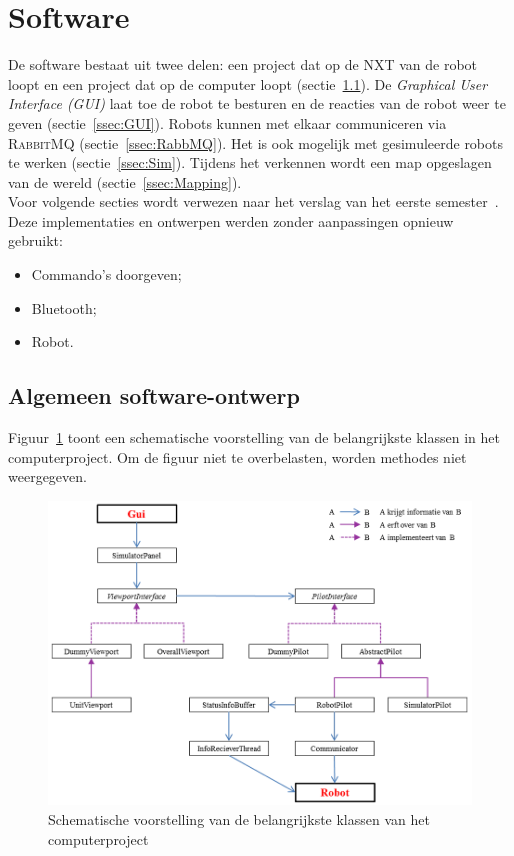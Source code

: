 \documentclass[eind]{penoverslag}
\begin{document}
\section{Software}
\label{sec:Softw}
De software bestaat uit twee delen: een project dat op de \textsc{NXT} van de robot loopt en een project dat op de computer loopt (sectie~\ref{ssec:Sdesign}). De \textit{Graphical User Interface (GUI)} laat toe de robot te besturen en de reacties van de robot weer te geven (sectie~\ref{ssec:GUI}). Robots kunnen met elkaar communiceren via \textsc{RabbitMQ} (sectie~\ref{ssec:RabbMQ}). Het is ook mogelijk met gesimuleerde robots te werken (sectie~\ref{ssec:Sim}). Tijdens het verkennen wordt een map opgeslagen van de wereld (sectie~\ref{ssec:Mapping}).\\

Voor volgende secties wordt verwezen naar het verslag van het eerste semester~\cite{Verslag1}. Deze implementaties en ontwerpen werden zonder aanpassingen opnieuw gebruikt:

\begin{itemize}
\item Commando's doorgeven;
\item Bluetooth;
\item Robot.
\end{itemize}

\subsection{Algemeen software-ontwerp}
\label{ssec:Sdesign}
Figuur~\ref{fig:klasSoft} toont een schematische voorstelling van de belangrijkste klassen in het computerproject. Om de figuur niet te overbelasten, worden methodes niet weergegeven.\\

\begin{figure}[h]
\centering
		\includegraphics[width=\textwidth]{KlasSoftware}
\caption[Structuur van computerproject]{Schematische voorstelling van de belangrijkste klassen van het computerproject}
\label{fig:klasSoft}
\end{figure}
\end{document}
